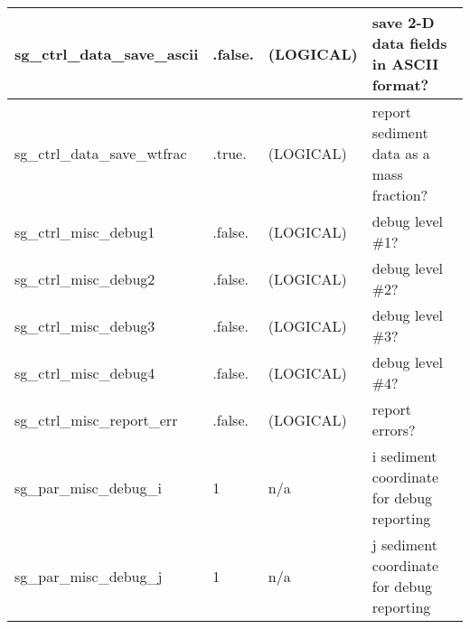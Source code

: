 \documentclass[english,10pt,twoside]{article}
\begin{document}
\begin{tabular}{ | l | l | l | l |}
   sg\_ctrl\_data\_save\_ascii & .false. & (LOGICAL) & save 2-D data fields in ASCII format? \\ \hline
   sg\_ctrl\_data\_save\_wtfrac & .true. & (LOGICAL) & report sediment data as a mass fraction? \\ \hline
   sg\_ctrl\_misc\_debug1 & .false. & (LOGICAL) & debug level \#1? \\ \hline
   sg\_ctrl\_misc\_debug2 & .false. & (LOGICAL) & debug level \#2? \\ \hline
   sg\_ctrl\_misc\_debug3 & .false. & (LOGICAL) & debug level \#3? \\ \hline
   sg\_ctrl\_misc\_debug4 & .false. & (LOGICAL) & debug level \#4? \\ \hline
   sg\_ctrl\_misc\_report\_err & .false. & (LOGICAL) & report errors? \\ \hline
   sg\_par\_misc\_debug\_i & 1 & n/a & i sediment coordinate for debug reporting \\ \hline
   sg\_par\_misc\_debug\_j & 1 & n/a & j sediment coordinate for debug reporting \\ \hline
   \end{tabular}
\end{document}
